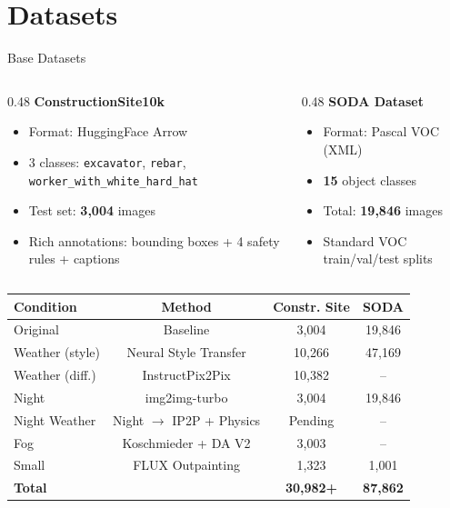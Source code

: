 \documentclass[aspectratio=169, 10pt]{beamer}
\begin{document}
\section{Datasets}

\begin{frame}{Base Datasets}
\begin{columns}[T]
\begin{column}{0.48\textwidth}
\textbf{\textcolor{boxblue}{ConstructionSite10k}}
\begin{itemize}
    \item Format: HuggingFace Arrow
    \item 3 classes: \texttt{excavator}, \texttt{rebar}, \texttt{worker\_with\_white\_hard\_hat}
    \item Test set: \textbf{3,004} images
    \item Rich annotations: bounding boxes + 4 safety rules + captions
\end{itemize}
\end{column}
\begin{column}{0.48\textwidth}
\textbf{\textcolor{boxorange}{SODA Dataset}}
\begin{itemize}
    \item Format: Pascal VOC (XML)
    \item \textbf{15} object classes
    \item Total: \textbf{19,846} images
    \item Standard VOC train/val/test splits
\end{itemize}
\end{column}
\end{columns}

\vspace{0.4em}
\centering
{\small
\begin{tabular}{lccc}
\toprule
\textbf{Condition} & \textbf{Method} & \textbf{Constr. Site} & \textbf{SODA} \\
\midrule
Original        & Baseline              & 3,004  & 19,846 \\
Weather (style) & Neural Style Transfer & 10,266 & 47,169 \\
Weather (diff.) & InstructPix2Pix       & 10,382 & --     \\
Night           & img2img-turbo         & 3,004  & 19,846 \\
\rowcolor{lightblue}
Night Weather   & Night $\to$ IP2P + Physics & Pending & --  \\
Fog             & Koschmieder + DA V2   & 3,003  & --     \\
Small           & FLUX Outpainting      & 1,323  & 1,001  \\
\midrule
\textbf{Total} &                        & \textbf{30,982+} & \textbf{87,862} \\
\bottomrule
\end{tabular}
}
\end{frame}
\end{document}
